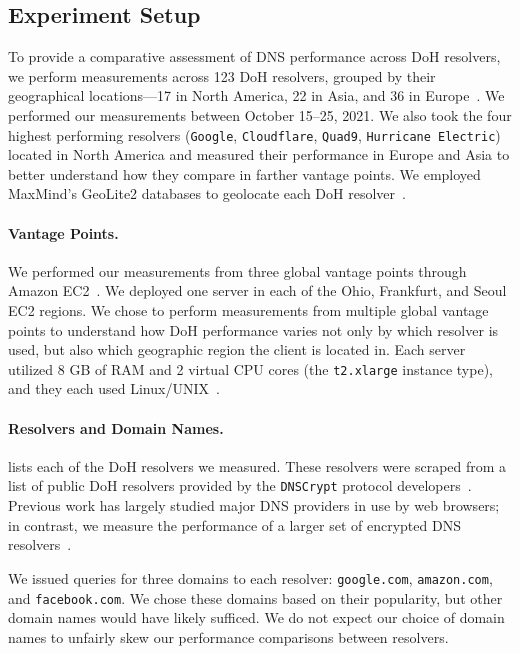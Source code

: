 \subsection{Experiment Setup} To provide a comparative assessment of DNS
performance across DoH resolvers, we perform measurements across 123 DoH
resolvers, grouped by their geographical locations—17 in North America, 22 in
Asia, and 36 in Europe~\cite{dnscrypt}.  We performed our measurements between
October 15--25, 2021.  We also took the four highest
performing resolvers (\texttt{Google}, \texttt{Cloudflare}, \texttt{Quad9},
\texttt{Hurricane Electric}) located in North America and measured their
performance in Europe and Asia to better understand how they compare in
farther vantage points.  We employed MaxMind's GeoLite2 databases to geolocate
each DoH resolver~\cite{maxmind}.

\paragraph{Vantage Points.} We performed our measurements from three global
vantage points through Amazon EC2~\cite{amazon_ec2}.  We deployed one server
in each of the Ohio, Frankfurt, and Seoul EC2 regions.  We chose to perform
measurements from multiple global vantage points to understand how DoH
performance varies not only by which resolver is used, but also which
geographic region the client is located in.  Each server utilized 8 GB of RAM
and 2 virtual CPU cores (the \texttt{t2.xlarge} instance type), and they each
used Linux/UNIX~\cite{amazon_ec2_instance_types}.

\paragraph{Resolvers and Domain Names.}  lists each of 
the DoH resolvers we measured.  These resolvers were
scraped from a list of public DoH resolvers provided by the \texttt{DNSCrypt}
protocol developers~\cite{dnscrypt-public-resolvers}.  Previous work has
largely studied major DNS providers in use by web browsers; in contrast, we
measure the performance of a larger set of encrypted DNS resolvers~\cite{hounsel2020comparing,hounsel2021can,hoang2020k,lu2019end-to-end}.

We issued queries for three domains to each resolver: \texttt{google.com}, 
\texttt{amazon.com}, and \texttt{facebook.com}.  We chose these domains based on their popularity, but
other domain names would have likely sufficed.  We do not expect our choice of
domain names to unfairly skew our performance comparisons between resolvers.

